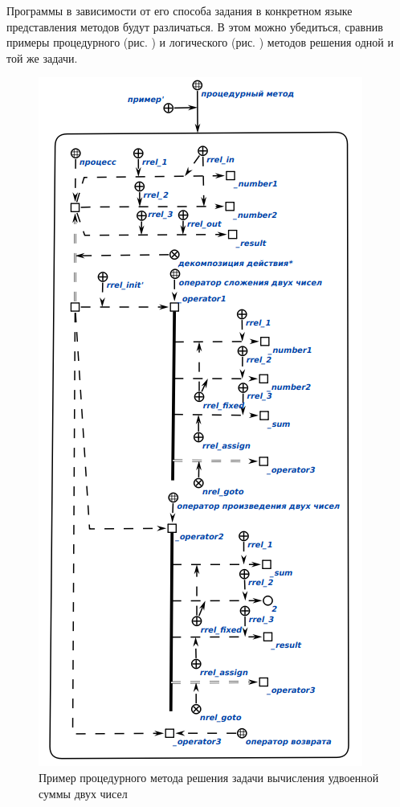 Программы в зависимости от его способа задания в конкретном языке представления методов будут различаться. В этом можно убедиться, сравнив примеры процедурного (рис. ) и логического (рис. ) методов решения одной и той же задачи.

\begin{figure}[htbp]  
  \center
  \includegraphics[scale=0.6]{author/part3/figures/procedural_program.png}
  \caption{Пример процедурного метода решения задачи вычисления удвоенной суммы двух чисел}
  \label{fig:procedural_program}
\end{figure}

